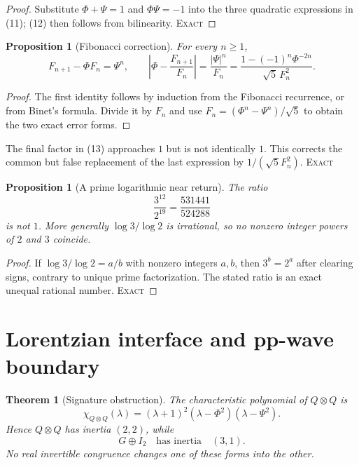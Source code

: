 \documentclass[10pt]{article}
\newtheorem{theorem}[definition]{Theorem}
\newtheorem{proposition}[definition]{Proposition}
\theoremstyle{remark}
\newcommand{\cstatus}[1]{\hfill\textsc{#1}}
\newcommand{\exact}{\textsc{Exact}}
\begin{document}
\begin{proof}
Substitute $\Phi+\Psi=1$ and $\Phi\Psi=-1$ into the three quadratic
expressions in (11); (12) then follows from bilinearity. \cstatus{\exact}
\end{proof}

\begin{proposition}[Fibonacci correction]\label{prop:fib}
For every $n\ge1$,
\[
 F_{n+1}-\Phi F_n=\Psi^n,
\qquad
 \left|\Phi-\frac{F_{n+1}}{F_n}\right|
=\frac{|\Psi|^n}{F_n}
=\frac{1-(-1)^n\Phi^{-2n}}{\sqrt5\,F_n^2}.
\tag{13}
\]
\end{proposition}

\begin{proof}
The first identity follows by induction from the Fibonacci recurrence, or
from Binet's formula.  Divide it by $F_n$ and use
$F_n=(\Phi^n-\Psi^n)/\sqrt5$ to obtain the two exact error forms.
\end{proof}

The final factor in (13) approaches $1$ but is not identically $1$.
This corrects the common but false replacement of the last expression by
$1/(\sqrt5F_n^2)$. \cstatus{\exact}

\begin{proposition}[A prime logarithmic near return]\label{prop:comma}
The ratio
\[
 \frac{3^{12}}{2^{19}}=\frac{531441}{524288}
\tag{14}
\]
is not $1$.  More generally $\log 3/\log 2$ is irrational, so no nonzero
integer powers of $2$ and $3$ coincide.
\end{proposition}

\begin{proof}
If $\log3/\log2=a/b$ with nonzero integers $a,b$, then $3^b=2^a$ after
clearing signs, contrary to unique prime factorization.  The stated ratio is
an exact unequal rational number. \cstatus{\exact}
\end{proof}

\section{Lorentzian interface and pp-wave boundary}

\begin{theorem}[Signature obstruction]\label{thm:signature}
The characteristic polynomial of $Q\otimes Q$ is
\[
 \chi_{Q\otimes Q}(\lambda)=
 (\lambda+1)^2(\lambda-\Phi^2)(\lambda-\Psi^2).
\tag{15}
\]
Hence $Q\otimes Q$ has inertia $(2,2)$, while
\[
 G\oplus I_2\quad\text{has inertia}\quad(3,1).
\tag{16}
\]
No real invertible congruence changes one of these forms into the other.
\end{theorem}
\end{document}

